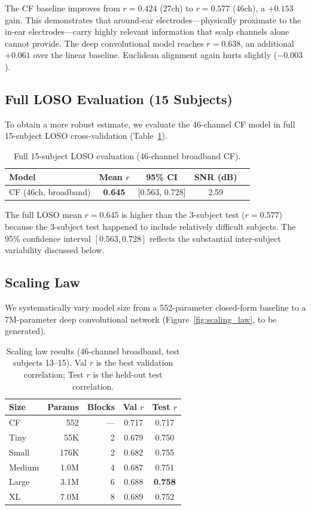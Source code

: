 \documentclass[conference]{IEEEtran}
\begin{document}
The CF baseline improves from $r = 0.424$ (27ch) to $r = 0.577$ (46ch), a $+0.153$ gain. This demonstrates that around-ear electrodes---physically proximate to the in-ear electrodes---carry highly relevant information that scalp channels alone cannot provide. The deep convolutional model reaches $r = 0.638$, an additional $+0.061$ over the linear baseline. Euclidean alignment again hurts slightly ($-0.003$).

\subsection{Full LOSO Evaluation (15 Subjects)}

To obtain a more robust estimate, we evaluate the 46-channel CF model in full 15-subject LOSO cross-validation (Table~\ref{tab:full_loso}).

\begin{table}[t]
\centering
\caption{Full 15-subject LOSO evaluation (46-channel broadband CF).}
\label{tab:full_loso}
\begin{tabular}{@{}lcccc@{}}
\toprule
Model & Mean $r$ & 95\% CI & SNR (dB) \\
\midrule
CF (46ch, broadband) & \textbf{0.645} & [0.563, 0.728] & 2.59 \\
\bottomrule
\end{tabular}
\end{table}

The full LOSO mean $r = 0.645$ is higher than the 3-subject test ($r = 0.577$) because the 3-subject test happened to include relatively difficult subjects. The 95\% confidence interval $[0.563, 0.728]$ reflects the substantial inter-subject variability discussed below.

\subsection{Scaling Law}

We systematically vary model size from a 552-parameter closed-form baseline to a 7M-parameter deep convolutional network (Figure~\ref{fig:scaling_law}, to be generated).

\begin{table}[t]
\centering
\caption{Scaling law results (46-channel broadband, test subjects 13--15). Val $r$ is the best validation correlation; Test $r$ is the held-out test correlation.}
\label{tab:scaling}
\begin{tabular}{@{}lrrcc@{}}
\toprule
Size & Params & Blocks & Val $r$ & Test $r$ \\
\midrule
CF & 552 & --- & 0.717 & 0.717 \\
Tiny & 55K & 2 & 0.679 & 0.750 \\
Small & 176K & 2 & 0.682 & 0.755 \\
Medium & 1.0M & 4 & 0.687 & 0.751 \\
Large & 3.1M & 6 & 0.688 & \textbf{0.758} \\
XL & 7.0M & 8 & 0.689 & 0.752 \\
\bottomrule
\end{tabular}
\end{table}
\end{document}
